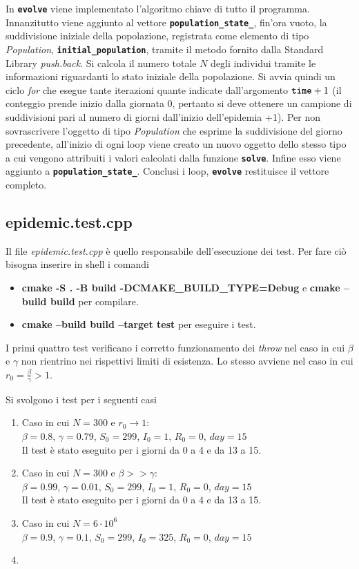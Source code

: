 \documentclass[11pt, a4paper]{article}
\begin{document}
In \textbf{\texttt{evolve}} viene implementato l'algoritmo chiave di tutto il programma. Innanzitutto viene aggiunto al vettore \textbf{\texttt{population\_state\_}}, fin'ora vuoto, la suddivisione iniziale della popolazione, registrata come elemento di tipo \textit{Population}, \textbf{\texttt{initial\_population}}, tramite il metodo fornito dalla Standard Library \textit{push.back}. Si calcola il numero totale $N$ degli individui tramite le informazioni riguardanti lo stato iniziale della popolazione.
Si avvia quindi un ciclo \textit{for} che esegue tante iterazioni quante indicate dall'argomento $\textbf{\texttt{time}} + 1$ (il conteggio prende inizio dalla giornata 0, pertanto si deve ottenere un campione di suddivisioni pari al numero di giorni dall'inizio dell'epidemia +1). Per non sovrascrivere l'oggetto di tipo \textit{Population} che esprime la suddivisione del giorno precedente, all'inizio di ogni loop viene creato un nuovo oggetto dello stesso tipo a cui vengono attribuiti i valori calcolati dalla funzione \textbf{\texttt{solve}}. Infine esso viene aggiunto a \textbf{\texttt{population\_state\_}}. Conclusi i loop, \textbf{\texttt{evolve}} restituisce il vettore completo.

\subsection{epidemic.test.cpp}
Il file \textit{epidemic.test.cpp} \`{e} quello responsabile dell'esecuzione dei test. Per fare ci\`{o} bisogna inserire in shell i comandi
\begin{itemize}
\item 
\textbf{cmake -S . -B build -DCMAKE\_BUILD\_TYPE=Debug} e 
    \textbf{cmake --build build} per compilare.  %
\item \textbf{cmake --build build --target test} per eseguire i test.
\end{itemize}
I primi quattro test verificano i corretto funzionamento dei \textit{throw} nel caso in cui $\beta$ e $\gamma$ non rientrino nei rispettivi limiti di esistenza. Lo stesso avviene nel caso in cui $r_0=\frac{\beta}{\gamma}>1$. 

Si svolgono i test per i seguenti casi
\begin{enumerate}
    \item Caso in cui $N=300 $ e $ r_0 \rightarrow 1$: \\ $\beta = 0.8$, $\gamma = 0.79$, $S_0 = 299$, $I_0 = 1$, $R_0 = 0$, $day = 15$ \\
    Il test \`{e} stato eseguito per i giorni da 0 a 4 e da 13 a 15.
    \item Caso in cui $N=300$ e $\beta >> \gamma$: \\ $\beta = 0.99$, $\gamma = 0.01$, $S_0 = 299$, $I_0 = 1$, $R_0 = 0$, $day = 15$ \\
        Il test \`{e} stato eseguito per i giorni da 0 a 4 e da 13 a 15.
    \item Caso in cui $N=6\cdot10^6$ \\ $\beta = 0.9$, $\gamma = 0.1$, $S_0 = 299$, $I_0 = 325$, $R_0 = 0$, $day = 15$
    \item 
\end{enumerate}
\end{document}
